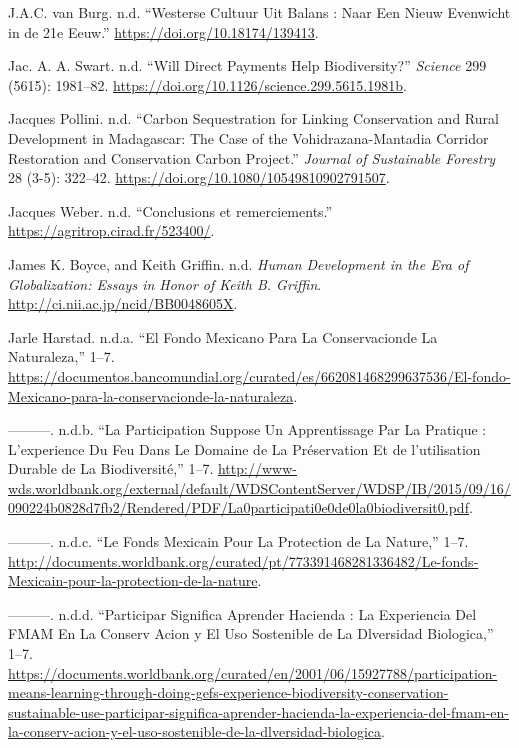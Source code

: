 \begin{CSLReferences}{1}{0}
J.A.C. van Burg. n.d. {``Westerse Cultuur Uit Balans : Naar Een Nieuw
Evenwicht in de 21e Eeuw.''} \url{https://doi.org/10.18174/139413}.

Jac. A. A. Swart. n.d. {``Will Direct Payments Help Biodiversity?''}
\emph{Science} 299 (5615): 1981--82.
\url{https://doi.org/10.1126/science.299.5615.1981b}.

Jacques Pollini. n.d. {``Carbon Sequestration for Linking Conservation
and Rural Development in Madagascar: The Case of the
Vohidrazana-Mantadia Corridor Restoration and Conservation Carbon
Project.''} \emph{Journal of Sustainable Forestry} 28 (3-5): 322--42.
\url{https://doi.org/10.1080/10549810902791507}.

Jacques Weber. n.d. {``Conclusions et remerciements.''}
\url{https://agritrop.cirad.fr/523400/}.

James K. Boyce, and Keith Griffin. n.d. \emph{Human Development in the
Era of Globalization: Essays in Honor of Keith B. Griffin}.
\url{http://ci.nii.ac.jp/ncid/BB0048605X}.

Jarle Harstad. n.d.a. {``El Fondo Mexicano Para La Conservacionde La
Naturaleza,''} 1--7.
\url{https://documentos.bancomundial.org/curated/es/662081468299637536/El-fondo-Mexicano-para-la-conservacionde-la-naturaleza}.

---------. n.d.b. {``La Participation Suppose Un Apprentissage Par La
Pratique : L'experience Du Feu Dans Le Domaine de La Préservation Et de
l'utilisation Durable de La Biodiversité,''} 1--7.
\url{http://www-wds.worldbank.org/external/default/WDSContentServer/WDSP/IB/2015/09/16/090224b0828d7fb2/Rendered/PDF/La0participati0e0de0la0biodiversit0.pdf}.

---------. n.d.c. {``Le Fonds Mexicain Pour La Protection de La
Nature,''} 1--7.
\url{http://documents.worldbank.org/curated/pt/773391468281336482/Le-fonds-Mexicain-pour-la-protection-de-la-nature}.

---------. n.d.d. {``Participar Significa Aprender Hacienda : La
Experiencia Del FMAM En La Conserv Acion y El Uso Sostenible de La
Dlversidad Biologica,''} 1--7.
\url{https://documents.worldbank.org/curated/en/2001/06/15927788/participation-means-learning-through-doing-gefs-experience-biodiversity-conservation-sustainable-use-participar-significa-aprender-hacienda-la-experiencia-del-fmam-en-la-conserv-acion-y-el-uso-sostenible-de-la-dlversidad-biologica}.


\end{CSLReferences}

